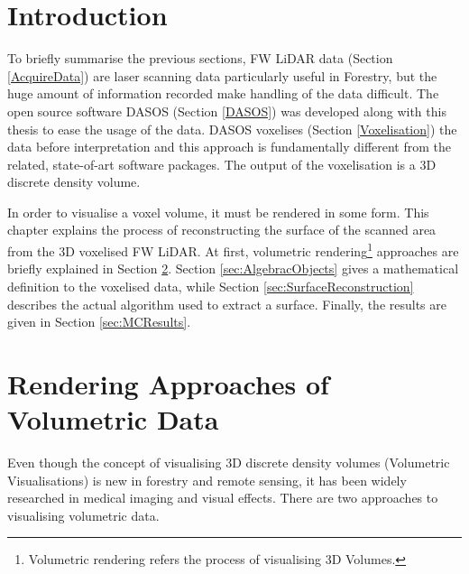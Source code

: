 \documentclass{subfiles}
\begin{document}
	

\section{Introduction}


\par To briefly summarise the previous sections, FW LiDAR data (Section \ref{AcquireData}) are laser scanning data particularly useful in Forestry, but the huge amount of information recorded make handling of the data difficult. The open source software DASOS (Section \ref{DASOS}) was developed along with this thesis to ease the usage of the data. DASOS voxelises (Section \ref{Voxelisation}) the data before interpretation and this approach is fundamentally different from the related, state-of-art software packages. The output of the voxelisation is a 3D discrete density volume. 

\par In order to visualise a voxel volume, it must be rendered in some form.  This chapter explains the process of reconstructing the surface of the scanned area from the 3D voxelised FW LiDAR. At first, volumetric rendering\footnote{Volumetric rendering refers the process of visualising 3D Volumes.} approaches are briefly explained in Section \ref{sec:RenderingApproaches}. Section \ref{sec:AlgebracObjects} gives a mathematical definition to the voxelised data, while Section \ref{sec:SurfaceReconstruction} describes the actual algorithm used to extract a surface. Finally, the results are given in Section \ref{sec:MCResults}. 


\section{Rendering Approaches of Volumetric Data}\label{sec:RenderingApproaches}
\par Even though the concept of visualising 3D discrete density volumes (Volumetric Visualisations) is new in forestry and remote sensing, it has been widely researched in medical imaging and visual effects. There are two approaches to visualising volumetric data.
\end{document}
